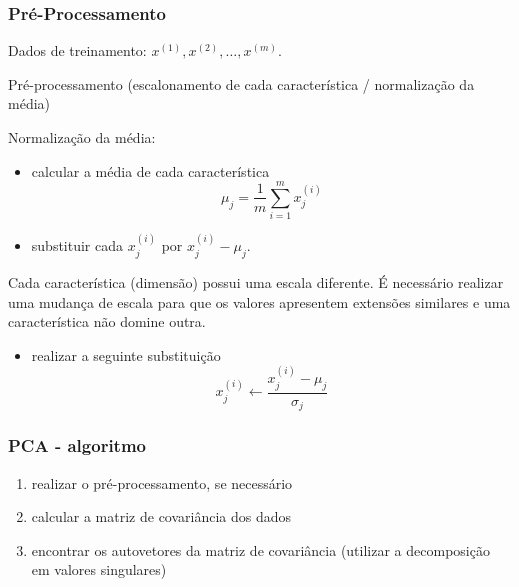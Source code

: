 \begin{frame}[allowframebreaks]
  \frametitle{Pré-Processamento}  
  Dados de treinamento: $x^{(1)}, x^{(2)}, \ldots, x^{(m)}$.

  Pré-processamento (escalonamento de cada característica / normalização da média)

  Normalização da média:
  \begin{itemize}
  \item calcular a média de cada característica
  \begin{equation}
  \mu_j = \frac{1}{m} \sum_{i=1}^{m} x_{j}^{(i)}
  \end{equation}
  \item substituir cada $x_{j}^{(i)}$ por $x_{j}^{(i)} - \mu_{j}$.
  \end{itemize}

  \framebreak

  Cada característica (dimensão) possui uma escala diferente. É necessário realizar uma mudança de escala
  para que os valores apresentem extensões similares e uma característica não domine outra.
  \begin{itemize}
  \item realizar a seguinte substituição
  \begin{equation}
  x_{j}^{(i)} \leftarrow \frac{ x_{j}^{(i)} - \mu_{j} }{\sigma_j}
  \end{equation}
  \end{itemize}

\end{frame}

\begin{frame}%
  \frametitle{PCA - algoritmo} 
  \begin{enumerate}
  \item realizar o pré-processamento, se necessário
  \item calcular a matriz de covariância dos dados
  \item encontrar os autovetores da matriz de covariância (utilizar a decomposição em valores singulares)
  \end{enumerate}   
\end{frame}

